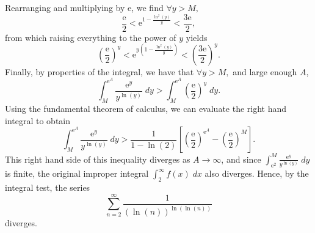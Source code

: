 \documentclass[
  10pt,
  a4paper]{article}
\theoremstyle{plain}
\theoremstyle{definition}
\theoremstyle{plain}
\theoremstyle{plain}
\theoremstyle{plain}
\theoremstyle{plain}
\theoremstyle{definition}
\theoremstyle{definition}
\theoremstyle{remark}
\theoremstyle{remark}
\begin{document}
Rearranging and multiplying by \(\mathrm{e}\), we find \(\forall y > M,\) \[\frac{\mathrm{e}}{2} < \mathrm{e}^{1 - \frac{\ln^2(y)}{y}} < \frac{3\mathrm{e}}{2},\] from which raising everything to the power of \(y\) yields \[\left(\frac{\mathrm{e}}{2}\right)^y < \mathrm{e}^{y\left(1 - \frac{\ln^2(y)}{y}\right)} < \left(\frac{3\mathrm{e}}{2}\right)^y.\] Finally, by properties of the integral, we have that \(\forall y > M,\) and large enough \(A\), \[\int_{M}^{\mathrm{e}^A}\frac{\mathrm{e}^y}{y^{\ln(y)}}\;dy > \int_M^{\mathrm{e}^A}\left(\frac{\mathrm{e}}{2}\right)^y\;dy.\] Using the fundamental theorem of calculus, we can evaluate the right hand integral to obtain \[\int_{M}^{\mathrm{e}^A}\frac{\mathrm{e}^y}{y^{\ln(y)}}\;dy > \frac{1}{1 - \ln(2)}\left[\left(\frac{\mathrm{e}}{2}\right)^{\mathrm{e}^A} - \left(\frac{\mathrm{e}}{2}\right)^{M} \right].\] This right hand side of this inequality diverges as \(A \to \infty\), and since \(\int_{\mathrm{e}^2}^M \frac{\mathrm{e}^y}{y^{\ln(y)}}\;dy\) is finite, the original improper integral \(\int_{2}^{\infty} f(x)\;dx\) also diverges. Hence, by the integral test, the series \[\sum_{n=2}^{\infty}\frac{1}{(\ln(n))^{\ln(\ln(n))}}\] diverges.
\end{document}
